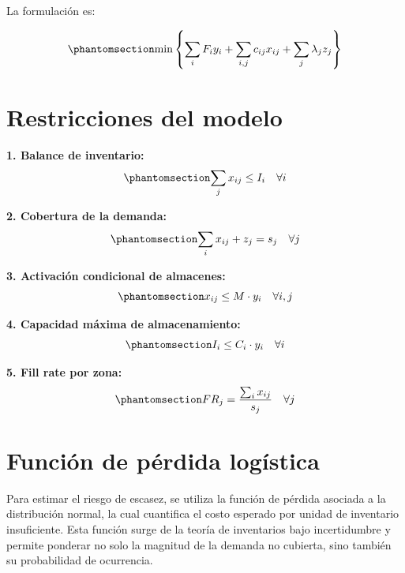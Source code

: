 \documentclass[
  spanish,
  us-letterpaper,
]{scrreprt}
\numberwithin{equation}{chapter} %
\begin{document}
La formulación es:

\begin{equation}\phantomsection\label{eq-PBHE_completa}{
\min \left\{ \sum_{i} F_i y_i + \sum_{i,j} c_{ij} x_{ij} + \sum_j \lambda_j z_j \right\} 
}\end{equation}

\section{Restricciones del modelo}\label{restricciones-del-modelo}

\textbf{1. Balance de inventario:}
\begin{equation}\phantomsection\label{eq-PBHE_completa}{
\sum_j x_{ij} \leq I_i \quad \forall i 
}\end{equation}

\textbf{2. Cobertura de la demanda:}
\begin{equation}\phantomsection\label{eq-PBHE_completa}{
\sum_i x_{ij} + z_j = s_j \quad \forall j 
}\end{equation}

\textbf{3. Activación condicional de almacenes:}
\begin{equation}\phantomsection\label{eq-PBHE_completa}{
x_{ij} \leq M \cdot y_i \quad \forall i,j 
}\end{equation}

\textbf{4. Capacidad máxima de almacenamiento:}
\begin{equation}\phantomsection\label{eq-PBHE_completa}{
I_i \leq C_i \cdot y_i \quad \forall i 
}\end{equation}

\textbf{5. Fill rate por zona:}
\begin{equation}\phantomsection\label{eq-PBHE_completa}{
FR_j = \frac{\sum_i x_{ij}}{s_j} \quad \forall j 
}\end{equation}

\section{Función de pérdida
logística}\label{funciuxf3n-de-puxe9rdida-loguxedstica}

Para estimar el riesgo de escasez, se utiliza la función de pérdida
asociada a la distribución normal, la cual cuantifica el costo esperado
por unidad de inventario insuficiente. Esta función surge de la teoría
de inventarios bajo incertidumbre y permite ponderar no solo la magnitud
de la demanda no cubierta, sino también su probabilidad de ocurrencia.
\end{document}
